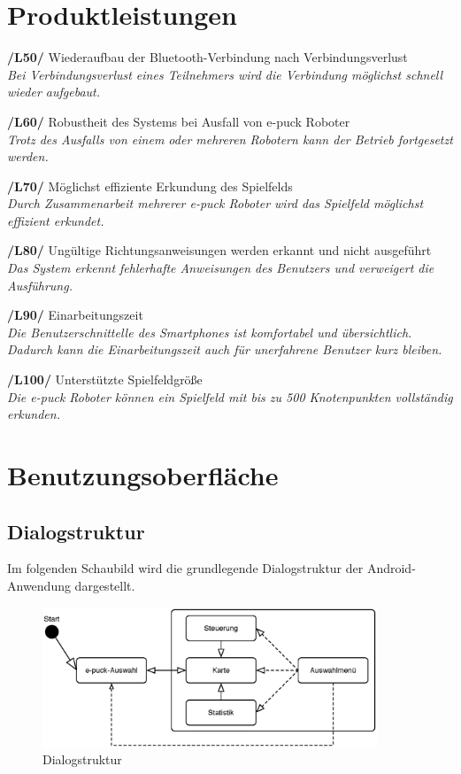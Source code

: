 \documentclass[10pt,a4paper]{article}
\let\oldsection\section
\renewcommand{\section}{\newpage \oldsection}
\begin{document}
	\section{Produktleistungen}
		\begin{list}{}{\leftmargin=1cm}
			\item[\textbf{/L50/}] Wiederaufbau der Bluetooth-Verbindung nach Verbindungsverlust
				\\ \textsl{Bei Verbindungsverlust eines Teilnehmers wird die Verbindung möglichst schnell wieder aufgebaut.}
			\item[\textbf{/L60/}] Robustheit des Systems bei Ausfall von e-puck Roboter
				\\ \textsl{Trotz des Ausfalls von einem oder mehreren Robotern kann der Betrieb fortgesetzt werden.}
			\item[\textbf{/L70/}] Möglichst effiziente Erkundung des Spielfelds
				\\ \textsl{Durch Zusammenarbeit mehrerer e-puck Roboter wird das Spielfeld möglichst effizient erkundet.}						
			\item[\textbf{/L80/}] Ungültige Richtungsanweisungen werden erkannt und nicht ausgeführt 
				\\ \textsl{Das System erkennt fehlerhafte Anweisungen des Benutzers und verweigert die Ausführung.}					
			\item[\textbf{/L90/}] Einarbeitungszeit 
				\\ \textsl{Die Benutzerschnittelle des Smartphones ist komfortabel und übersichtlich. Dadurch kann die Einarbeitungszeit
					auch für unerfahrene Benutzer kurz bleiben.}
			\item[\textbf{/L100/}] Unterstützte Spielfeldgröße 
				\\ \textsl{Die e-puck Roboter können ein Spielfeld mit bis zu 500 Knotenpunkten vollständig erkunden.}							
		\end{list}						
	\section{Benutzungsoberfläche}
	
			\subsection{Dialogstruktur}
			Im folgenden Schaubild wird die grundlegende Dialogstruktur der Android-Anwendung dargestellt.
			
			\begin{figure}[h]
				\centering
				\includegraphics[width=10cm]{dialog.eps}
  				\caption{Dialogstruktur}
  			\end{figure}
  			
\end{document}
